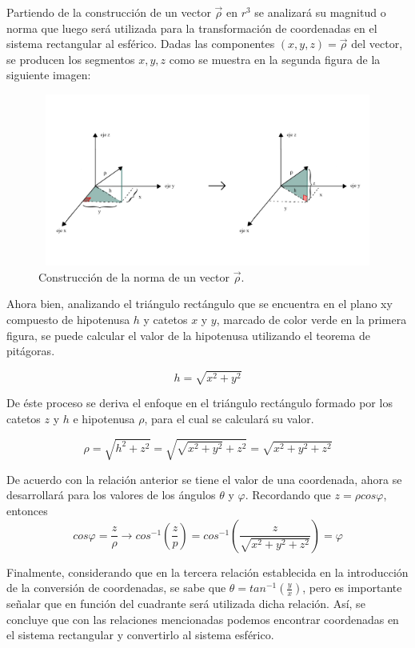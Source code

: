 Partiendo de la construcción de un vector ${\vec{\rho}}$ en ${r^{3}}$ se analizará su magnitud o norma que luego será utilizada para la transformación de coordenadas en el sistema rectangular al esférico. Dadas las componentes ${ \left( x,y,z \right )} = \vec{\rho}$ del vector, se producen los segmentos ${x,y,z}$ como se muestra en la segunda figura de la siguiente imagen:

\begin{figure}[H]
  \centering
  \includegraphics[width=11.17cm, height=5.67cm]{img/graph/norma_vectorial.jpg}
  \caption{Construcción de la norma de un vector ${\vec{\rho}}$.}
  \label{relacion_de_coordenadas}
\end{figure}

Ahora bien, analizando el triángulo rectángulo que se encuentra en el plano xy compuesto de hipotenusa ${h}$ y catetos ${x}$ y ${y}$, marcado de color verde en la primera figura, se puede calcular el valor de la hipotenusa utilizando el teorema de pitágoras.

\[ h = \sqrt{x^{2} + y^{2}} \]

\vspace{4mm}
De éste proceso se deriva el enfoque en el triángulo rectángulo formado por los catetos ${z}$ y ${h}$ e hipotenusa ${\rho}$, para el cual se calculará su valor.

\[ \rho = \sqrt{h^{2} + z^{2}} = \sqrt{\sqrt{x^{2} + y^{2}} + z^{2}} = \sqrt{x^{2} + y^{2} + z^{2} } \]

De acuerdo con la relación anterior se tiene el valor de una coordenada, ahora se desarrollará para los valores de los ángulos ${\theta}$ y ${\varphi}$. Recordando que ${z = \rho cos \varphi }$, entonces
\[cos\varphi = \frac{z}{\rho} \rightarrow cos^{-1} \left(\frac{z}{p}\right) = cos^{-1} \left(\frac{z}{\sqrt{x^{2} + y^{2} + z^{2} }}\right) = \varphi \]

Finalmente, considerando que en la tercera relación establecida en la introducción de la conversión de coordenadas, se sabe que ${\theta = tan^{-1}\left(\frac{y}{x}\right)}$, pero es importante señalar que en función del cuadrante será utilizada dicha relación. Así, se concluye que con las relaciones mencionadas podemos encontrar coordenadas en el sistema rectangular y convertirlo al sistema esférico.
